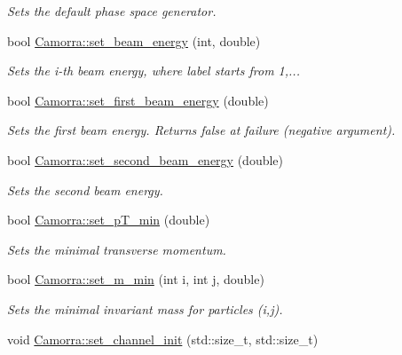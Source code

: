 \begin{DoxyCompactItemize}
\begin{DoxyCompactList}\small\item\em Sets the default phase space generator. \end{DoxyCompactList}\item 
\hypertarget{a00798_ae560fbf687bfc8cf484439ccccaaeffb}{
bool \hyperlink{a00798_ae560fbf687bfc8cf484439ccccaaeffb}{Camorra::set\_\-beam\_\-energy} (int, double)}
\label{a00798_ae560fbf687bfc8cf484439ccccaaeffb}

\begin{DoxyCompactList}\small\item\em Sets the i-\/th beam energy, where label starts from 1,... \end{DoxyCompactList}\item 
\hypertarget{a00798_a6de95ee5984e0f2180101b7f76b90dd1}{
bool \hyperlink{a00798_a6de95ee5984e0f2180101b7f76b90dd1}{Camorra::set\_\-first\_\-beam\_\-energy} (double)}
\label{a00798_a6de95ee5984e0f2180101b7f76b90dd1}

\begin{DoxyCompactList}\small\item\em Sets the first beam energy. Returns false at failure (negative argument). \end{DoxyCompactList}\item 
bool \hyperlink{a00798_a1f6331ed932b7900c6a4e89d59526d60}{Camorra::set\_\-second\_\-beam\_\-energy} (double)
\begin{DoxyCompactList}\small\item\em Sets the second beam energy. \end{DoxyCompactList}\item 
bool \hyperlink{a00798_a70cde83b3ea17f67590455791aa2ae34}{Camorra::set\_\-pT\_\-min} (double)
\begin{DoxyCompactList}\small\item\em Sets the minimal transverse momentum. \end{DoxyCompactList}\item 
bool \hyperlink{a00798_a28cef035343874fc7bc8685ae3536c7c}{Camorra::set\_\-m\_\-min} (int i, int j, double)
\begin{DoxyCompactList}\small\item\em Sets the minimal invariant mass for particles (i,j). \end{DoxyCompactList}\item 
\hypertarget{a00798_a7806d9dd46348bf9e97a288184f8f5c3}{
void \hyperlink{a00798_a7806d9dd46348bf9e97a288184f8f5c3}{Camorra::set\_\-channel\_\-init} (std::size\_\-t, std::size\_\-t)}
\label{a00798_a7806d9dd46348bf9e97a288184f8f5c3}


\end{DoxyCompactItemize}
